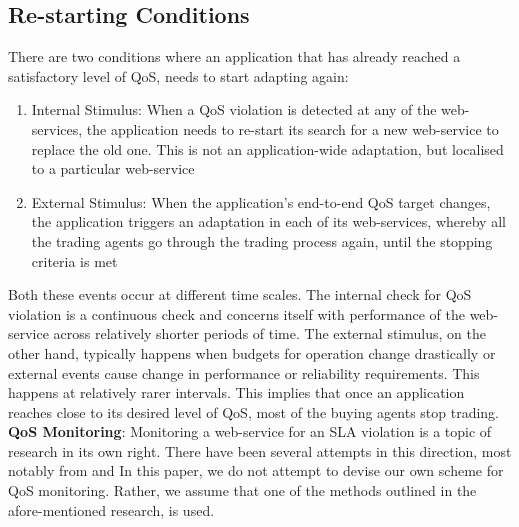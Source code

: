 \documentclass[10pt,journal,compsoc]{IEEEtran}
\begin{document}
\subsection{Re-starting Conditions}
There are two conditions where an application that has already reached a satisfactory level of QoS, needs to start adapting again:
	\begin{enumerate}
	    \item Internal Stimulus: When a QoS violation is detected at any of the web-services, the application needs to re-start its search for a new web-service to replace the old one. This is not an application-wide adaptation, but localised to a particular web-service
	     \item External Stimulus: When the application's end-to-end QoS target changes, the application triggers an adaptation in each of its web-services, whereby all the trading agents go through the trading process again, until the stopping criteria is met
	\end{enumerate}
Both these events occur at different time scales. The internal check for QoS violation is a continuous check and concerns itself with performance of the web-service across relatively shorter periods of time. The external stimulus, on the other hand, typically happens when budgets for operation change drastically or external events cause change in performance or reliability requirements. This happens at relatively rarer intervals. This implies that once an application reaches close to its desired level of QoS, most of the buying agents stop trading.\\
\textbf{QoS Monitoring}: Monitoring a web-service for an SLA violation is a topic of research in its own right. There have been several attempts in this direction, most notably from \cite{Chau2008Automatinga, Michlmayr2009Comprehensive, Raimondi2008Efficient} and \cite{Skene2004Precise} In this paper, we do not attempt to devise our own scheme for QoS monitoring. Rather, we assume that one of the methods outlined in the afore-mentioned research, is used. 
\end{document}
